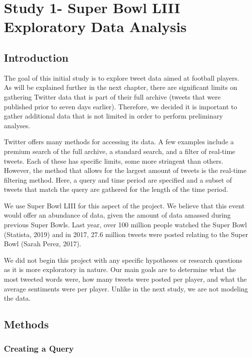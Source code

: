 \documentclass[12pt,twoside]{reedthesis}
\begin{document}
\chapter{Study 1- Super Bowl LIII Exploratory Data
Analysis}\label{study-1--super-bowl-liii-exploratory-data-analysis}

\section{Introduction}\label{introduction}

The goal of this initial study is to explore tweet data aimed at
football players. As will be explained further in the next chapter,
there are significant limits on gathering Twitter data that is part of
their full archive (tweets that were published prior to seven days
earlier). Therefore, we decided it is important to gather additional
data that is not limited in order to perform preliminary analyses.

Twitter offers many methods for accessing its data. A few examples
include a premium search of the full archive, a standard search, and a
filter of real-time tweets. Each of these has specific limits, some more
stringent than others. However, the method that allows for the largest
amount of tweets is the real-time filtering method. Here, a query and
time period are specified and a subset of tweets that match the query
are gathered for the length of the time period.

We use Super Bowl LIII for this aspect of the project. We believe that
this event would offer an abundance of data, given the amount of data
amassed during previous Super Bowls. Last year, over 100 million people
watched the Super Bowl (Statista, 2019) and in 2017, 27.6 million tweets
were posted relating to the Super Bowl (Sarah Perez, 2017).

We did not begin this project with any specific hypotheses or research
questions as it is more exploratory in nature. Our main goals are to
determine what the most tweeted words were, how many tweets were posted
per player, and what the average sentiments were per player. Unlike in
the next study, we are not modeling the data.

\section{Methods}\label{methods}

\subsection{Creating a Query}\label{creating-a-query}
\end{document}
